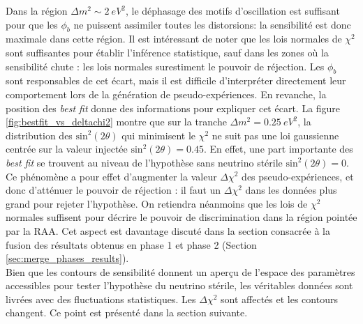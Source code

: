 Dans la région $\Delta m^2 \sim \SI{2}{eV^2}$, le déphasage des motifs d'oscillation est suffisant pour que les $\phi_b$ ne puissent assimiler toutes les distorsions: la sensibilité est donc maximale dans cette région. Il est intéressant de noter que les lois normales de $\chi^2$ sont suffisantes pour établir l'inférence statistique, sauf dans les zones où la sensibilité chute : les lois normales surestiment le pouvoir de réjection. Les $\phi_b$ sont responsables de cet écart, mais il est difficile d'interpréter directement leur comportement lors de la génération de pseudo-expériences. En revanche, la position des \textit{best fit} donne des informations pour expliquer cet écart. La figure \ref{fig:bestfit_vs_deltachi2} montre que sur la tranche $\Delta m^2 = \SI{0.25}{eV^2}$, la distribution des $\textrm{sin}^2(2\theta)$ qui minimisent le $\chi^2$ ne suit pas une loi gaussienne centrée sur la valeur injectée $\textrm{sin}^2(2\theta) = 0.45$. En effet, une part importante des \textit{best fit} se trouvent au niveau de l'hypothèse sans neutrino stérile $\textrm{sin}^2(2\theta) = 0$. Ce phénomène a pour effet d'augmenter la valeur $\Delta\chi^2$ des pseudo-expériences, et donc d'atténuer le pouvoir de réjection : il faut un $\Delta\chi^2$ dans les données plus grand pour rejeter l'hypothèse. On retiendra néanmoins que les lois de $\chi^2$ normales suffisent pour décrire le pouvoir de discrimination dans la région pointée par la RAA. Cet aspect est davantage discuté dans la section consacrée à la fusion des résultats obtenus en phase 1 et phase 2 (Section \ref{sec:merge_phases_results}).\\

Bien que les contours de sensibilité donnent un aperçu de l'espace des paramètres accessibles pour tester l'hypothèse du neutrino stérile, les véritables données sont livrées avec des fluctuations statistiques. Les $\Delta\chi^2$ sont affectés et les contours changent. Ce point est présenté dans la section suivante.

\bigbreak




